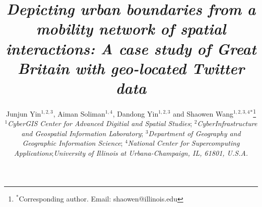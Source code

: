 \documentclass[]{tGIS2e}
\begin{document}


\title{{\itshape Depicting urban boundaries from a mobility network of spatial interactions: A case study of Great Britain with geo-located Twitter data}}

\author{Junjun Yin$^{1,2,3}$, Aiman Soliman$^{1,4}$, Dandong Yin$^{1,2,3}$ and Shaowen Wang$^{1,2,3,4}$$^{\ast}$\thanks{$^\ast$Corresponding author. Email: shaowen@illinois.edu
\vspace{6pt}}\\\vspace{6pt}  $^{1}${\em{CyberGIS Center for Advanced Digitial and Spatial Studies}};
$^{2}${\em{CyberInfrastructure and Geospatial Information Laboratory}};
$^{3}${\em{Department of Geography and Geographic Information Science}};
$^{4}${\em{National Center for Supercomputing Applications}};{\em{University of Illinois at Urbana-Champaign, IL, 61801, U.S.A.}}
\\\vspace{6pt}}
\maketitle
\end{document}
